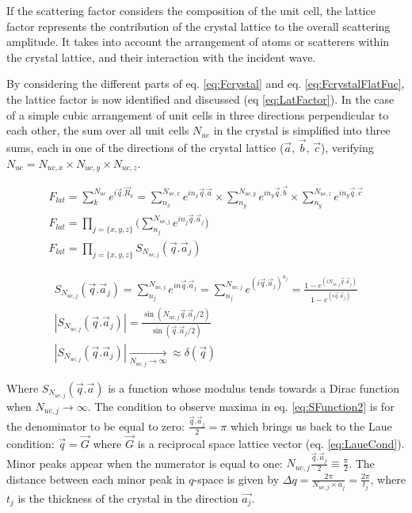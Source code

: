 If the scattering factor considers the composition of the unit cell, the lattice factor represents the contribution of the crystal lattice to the overall scattering amplitude.
It takes into account the arrangement of atoms or scatterers within the crystal lattice, and their interaction with the incident wave.

By considering the different parts of eq. \ref{eq:Fcrystal} and eq. \ref{eq:FcrystalFlatFuc}, the lattice factor is now identified and discussed (eq \ref{eq:LatFactor}).
In the case of a simple cubic arrangement of unit cells in three directions perpendicular to each other, the sum over all unit cells $N_{uc}$ in the crystal is simplified into three sums, each in one of the directions of the crystal lattice ($\vec{a}, \, \vec{b}, \, \vec{c}$), verifying $N_{uc} = N_{uc, x} \times N_{uc, y} \times N_{uc, z}$.

\begin{gather}
    \label{eq:LatFactor}
    F_{lat} = \sum_k^{N_{uc}} e^{i\vec{q}.\vec{R}_k} = \sum_{n_x}^{N_{uc, x}} e^{i n_x\vec{q}.\vec{a}} \times \sum_{n_y}^{N_{uc, y}} e^{i n_y\vec{q}.\vec{b}} \times \sum_{n_y}^{N_{uc, z}} e^{i n_y\vec{q}.\vec{c}}\\
    F_{lat} = \prod_{j=\{x,y,z\}} \Bigg( \sum_{n_j}^{N_{uc, j}} e^{i n_j\vec{q}.\vec{a}_j} \Bigg)\\
    F_{lat} = \prod_{j=\{x,y,z\}} S_{N_{uc, j}}(\vec{q}.\vec{a}_j)
\end{gather}

\begin{gather}
    \label{eq:SFunction1}
    S_{N_{uc, j}}(\vec{q}.\vec{a}_j) = \sum_{n_j}^{N_{uc, j}} e^{in\vec{q}.\vec{a}_j} = \sum_{n_j}^{N_{uc, j}} e^{(i\vec{q}.\vec{a}_j)^{n_j}} = \frac{1-e^{(i N_{uc, j} \vec{q}.\vec{a}_j)}}{1-e^{(i\vec{q}.\vec{a}_j)}} \\
    \label{eq:SFunction2}
    |S_{N_{uc, j}}(\vec{q}.\vec{a}_j)| = \frac{\sin(N_{uc, j} \vec{q}.\vec{a}_j/2)}{\sin(\vec{q}.\vec{a}_j/2)} \\
    \label{eq:SFunction3}
    |S_{N_{uc, j}}(\vec{q}.\vec{a}_j)| \underset{N_{uc, j} \to \infty}{\longrightarrow} \approx \delta (\vec{q})
\end{gather}

Where $S_{N_{uc, j}}(\vec{q}.\vec{a})$ is a function whose modulus tends towards a Dirac function when $N_{uc, j} \longrightarrow \infty$.
The condition to observe maxima in eq. \ref{eq:SFunction2} is for the denominator to be equal to zero: $\frac{\vec{q}.\vec{a}_j}{2} = \pi$ which brings us back to the Laue condition: $\vec{q} = \vec{G}$ where $\vec{G}$ is a reciprocal space lattice vector (eq. \ref{eq:LaueCond}).
Minor peaks appear when the numerator is equal to one: $N_{uc, j}\frac{\vec{q}.\vec{a}_j}{2} \equiv \frac{\pi}{2}$.
The distance between each minor peak in $q$-space is given by $\Delta q = \frac{2\pi}{N_{uc, j} \times a_j} = \frac{2\pi}{t_j}$, where $t_j$ is the thickness of the crystal in the direction $\vec{a_j}$.

